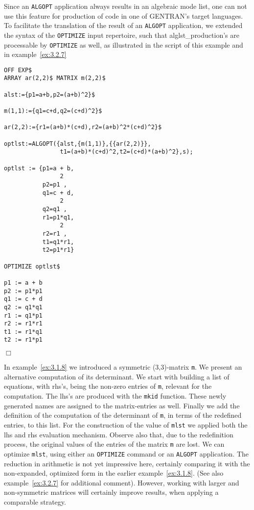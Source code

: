 Since an {\tt ALGOPT} application always results in an algebraic mode list,
one can not use this feature for production of code in one of GENTRAN's target
languages. To facilitate the translation of the result of an {\tt ALGOPT}
application, we extended the syntax of the {\tt OPTIMIZE} input repertoire, 
such that alglst\_production's are processable by {\tt OPTIMIZE} 
as well, as illustrated in the script of this example and 
in example~\ref{ex:3.2.7}
{\small
\begin{verbatim}
OFF EXP$
ARRAY ar(2,2)$ MATRIX m(2,2)$

alst:={p1=a+b,p2=(a+b)^2}$

m(1,1):={q1=c+d,q2=(c+d)^2}$

ar(2,2):={r1=(a+b)*(c+d),r2=(a+b)^2*(c+d)^2}$

optlst:=ALGOPT({alst,{m(1,1)},{{ar(2,2)}},
                t1=(a+b)*(c+d)^2,t2=(c+d)*(a+b)^2},s);

optlst := {p1=a + b,
                2
           p2=p1 ,
           q1=c + d,
                2
           q2=q1 ,
           r1=p1*q1,
                2
           r2=r1 ,
           t1=q1*r1,
           t2=p1*r1}

OPTIMIZE optlst$

p1 := a + b
p2 := p1*p1
q1 := c + d
q2 := q1*q1
r1 := q1*p1
r2 := r1*r1
t1 := r1*q1
t2 := r1*p1
\end{verbatim}
\begin{flushright}
$\Box$
\end{flushright}}
\example\label{ex:3.2.5}

In example~\ref{ex:3.1.8} we introduced a symmetric (3,3)-matrix {\tt m}. We
present an alternative computation of its determinant. We start with building 
a list of equations, with rhs's, being the non-zero entries of {\tt m}, 
relevant for the computation. The lhs's are produced with 
the {\tt mkid} function. These
newly generated names are assigned to the matrix-entries as well. Finally
we add the definition of the computation of the determinant of {\tt m}, 
in terms of the redefined entries, to this list. 
For the construction of the value of {\tt mlst} we applied both the lhs and
rhs evaluation mechanism. Observe also that, due to the redefinition process,
the original values of the entries of the matrix {\tt m} are lost.
We can optimize {\tt mlst}, using
either an {\tt OPTIMIZE} command or an {\tt ALGOPT} application. The reduction
in arithmetic is not yet impressive here, certainly comparing it with the 
non-expanded, optimized form in the earlier example~\ref{ex:3.1.8}. 
(See also example~\ref{ex:3.2.7} for additional comment).
However, working with larger and non-symmetric matrices will certainly 
improve results, when applying a comparable strategy. 

